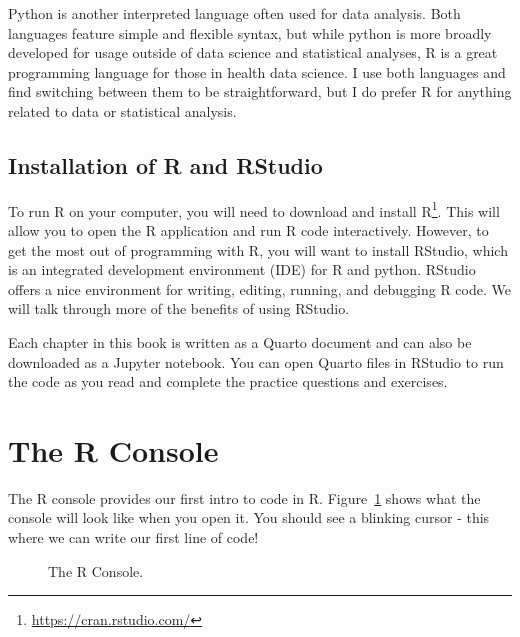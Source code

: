 \documentclass[
  letterpaper,
]{krantz}
\renewcommand{\href}[2]{#2\footnote{\url{#1}}}
\begin{document}
Python is another interpreted language often used for data analysis.
Both languages feature simple and flexible syntax, but while python is
more broadly developed for usage outside of data science and statistical
analyses, R is a great programming language for those in health data
science. I use both languages and find switching between them to be
straightforward, but I do prefer R for anything related to data or
statistical analysis.

\subsection{Installation of R and
RStudio}\label{installation-of-r-and-rstudio}

To run R on your computer, you will need to download and install
\href{https://cran.rstudio.com/}{R}. This will allow you to open the R
application and run R code interactively. However, to get the most out
of programming with R, you will want to install RStudio, which is an
integrated development environment (IDE) for R and python. RStudio
offers a nice environment for writing, editing, running, and debugging R
code. We will talk through more of the benefits of using RStudio.

Each chapter in this book is written as a Quarto document and can also
be downloaded as a Jupyter notebook. You can open Quarto files in
RStudio to run the code as you read and complete the practice questions
and exercises.

\section{The R Console}\label{the-r-console}

The R console provides our first intro to code in R.
Figure~\ref{fig-r-console} shows what the console will look like when
you open it. You should see a blinking cursor - this where we can write
our first line of code!

\begin{figure}


\caption{\label{fig-r-console}The R Console.}

\end{figure}%
\end{document}

